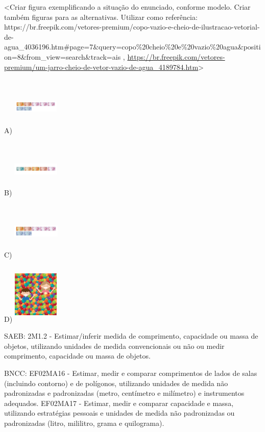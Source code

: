 \textless{}Criar figura exemplificando a situação do enunciado, conforme
modelo. Criar também figuras para as alternativas. Utilizar como
referência:
https://br.freepik.com/vetores-premium/copo-vazio-e-cheio-de-ilustracao-vetorial-de-agua\_4036196.htm\#page=7\&query=copo\%20cheio\%20e\%20vazio\%20agua\&position=8\&from\_view=search\&track=ais
,
\url{https://br.freepik.com/vetores-premium/um-jarro-cheio-de-vetor-vazio-de-agua_4189784.htm}\textgreater{}

A)
\includegraphics[width=0.85660in,height=1.10720in]{media/image145.png}

B)
\includegraphics[width=0.87104in,height=1.07664in]{media/image146.png}

C)
\includegraphics[width=0.88672in,height=1.06792in]{media/image145.png}

D)
\includegraphics[width=0.86059in,height=1.12017in]{media/image147.png}

SAEB: 2M1.2 - Estimar/inferir medida de comprimento, capacidade ou massa
de objetos, utilizando unidades de medida convencionais ou não ou medir
comprimento, capacidade ou massa de objetos.

BNCC: EF02MA16 - Estimar, medir e comparar comprimentos de lados de
salas (incluindo contorno) e de polígonos, utilizando unidades de medida
não padronizadas e padronizadas (metro, centímetro e milímetro) e
instrumentos adequados. EF02MA17 - Estimar, medir e comparar capacidade
e massa, utilizando estratégias pessoais e unidades de medida não
padronizadas ou padronizadas (litro, mililitro, grama e quilograma).

